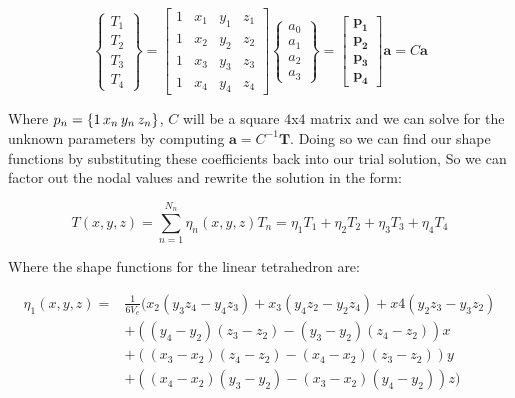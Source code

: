 \documentclass[12pt]{article}
\begin{document}
\begin{equation}
\begin{Bmatrix} T_1 \\ T_2 \\ T_3 \\ T_4 \end{Bmatrix} = 
\begin{bmatrix} 1 & x_1 & y_1 & z_1 \\ 1 & x_2 & y_2 & z_2 \\ 1 & x_3 & y_3 & z_3 \\ 1 & x_4 & y_4 & z_4\end{bmatrix}
\begin{Bmatrix} a_0 \\ a_1 \\ a_2 \\ a_3 \end{Bmatrix} =
\begin{bmatrix} \mathbf{p_1} \\ \mathbf{p_2} \\ \mathbf{p_3} \\ \mathbf{p_4} \end{bmatrix}\mathbf{a} = C\mathbf{a}
\end{equation}

Where $p_n=\{1 \thinspace x_n \thinspace y_n \thinspace z_n\}$, $C$ will be a square $4$x$4$ matrix and we can solve for the unknown parameters by computing $\mathbf{a}=C^{-1}\mathbf{T}$. Doing so we can find our shape functions by substituting these coefficients back into our trial solution, So we can factor out the nodal values and rewrite the solution in the form:

\begin{equation}
T(x,y,z) = \sum_{n=1}^{N_n} \eta_n{(x,y,z)} T_n = \eta_1 T_1 + \eta_2 T_2 + \eta_3 T_3 + \eta_4 T_4
\end{equation}

Where the shape functions for the linear tetrahedron are:

\begin{align*}
\eta_1(x,y,z)=&\frac{1}{6V_e}(
x_2(y_3z_4-y_4z_3)+x_3(y_4z_2-y_2z_4)+x4(y_2z_3-y_3z_2) \\
&+ ((y_4-y_2)(z_3-z_2)-(y_3-y_2)(z_4-z_2))x \\
&+ ((x_3-x_2)(z_4-z_2)-(x_4-x_2)(z_3-z_2))y \\
&+ ((x_4-x_2)(y_3-y_2)-(x_3-x_2)(y_4-y_2))z)
\end{align*}
\end{document}
